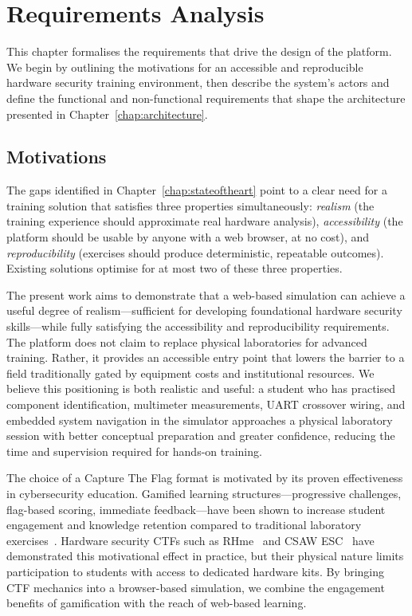 \chapter{Requirements Analysis}\label{chap:requirements}

This chapter formalises the requirements that drive the design of the \pcbctf{} platform. We begin by outlining the motivations for an accessible and reproducible hardware security training environment, then describe the system's actors and define the functional and non-functional requirements that shape the architecture presented in Chapter~\ref{chap:architecture}.

\section{Motivations}\label{sec:motivations}

The gaps identified in Chapter~\ref{chap:stateoftheart} point to a clear need for a training solution that satisfies three properties simultaneously: \emph{realism} (the training experience should approximate real hardware analysis), \emph{accessibility} (the platform should be usable by anyone with a web browser, at no cost), and \emph{reproducibility} (exercises should produce deterministic, repeatable outcomes). Existing solutions optimise for at most two of these three properties.

The present work aims to demonstrate that a web-based simulation can achieve a useful degree of realism---sufficient for developing foundational hardware security skills---while fully satisfying the accessibility and reproducibility requirements. The platform does not claim to replace physical laboratories for advanced training. Rather, it provides an accessible entry point that lowers the barrier to a field traditionally gated by equipment costs and institutional resources. We believe this positioning is both realistic and useful: a student who has practised component identification, multimeter measurements, UART crossover wiring, and embedded system navigation in the simulator approaches a physical laboratory session with better conceptual preparation and greater confidence, reducing the time and supervision required for hands-on training.

The choice of a Capture The Flag format is motivated by its proven effectiveness in cybersecurity education. Gamified learning structures---progressive challenges, flag-based scoring, immediate feedback---have been shown to increase student engagement and knowledge retention compared to traditional laboratory exercises~\cite{ctfd, hamari2014}. Hardware security CTFs such as RHme~\cite{rhme} and CSAW ESC~\cite{csawesc} have demonstrated this motivational effect in practice, but their physical nature limits participation to students with access to dedicated hardware kits. By bringing CTF mechanics into a browser-based simulation, we combine the engagement benefits of gamification with the reach of web-based learning.

